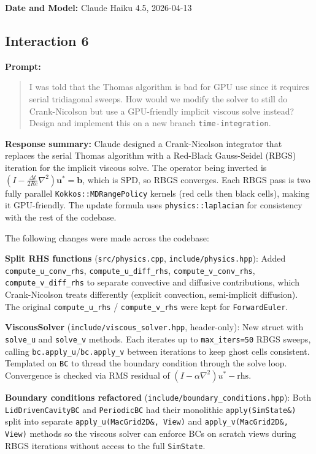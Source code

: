 \textbf{Date and Model:} Claude Haiku 4.5, 2026-04-13

\subsection*{Interaction 6}

\textbf{Prompt:}
\begin{quote}
I was told that the Thomas algorithm is bad for GPU use since it requires serial tridiagonal sweeps. How would we modify the solver to still do Crank-Nicolson but use a GPU-friendly implicit viscous solve instead? Design and implement this on a new branch \texttt{time-integration}.
\end{quote}

\textbf{Response summary:}
Claude designed a Crank-Nicolson integrator that replaces the serial Thomas algorithm with a Red-Black Gauss-Seidel (RBGS) iteration for the implicit viscous solve. The operator being inverted is $(I - \frac{\Delta t}{2 Re}\nabla^2)\mathbf{u}^* = \mathbf{b}$, which is SPD, so RBGS converges. Each RBGS pass is two fully parallel \texttt{Kokkos::MDRangePolicy} kernels (red cells then black cells), making it GPU-friendly. The update formula uses \texttt{physics::laplacian} for consistency with the rest of the codebase.

The following changes were made across the codebase:

\textbf{Split RHS functions} (\texttt{src/physics.cpp}, \texttt{include/physics.hpp}):
Added \texttt{compute\_u\_conv\_rhs}, \texttt{compute\_u\_diff\_rhs}, \texttt{compute\_v\_conv\_rhs}, \texttt{compute\_v\_diff\_rhs} to separate convective and diffusive contributions, which Crank-Nicolson treats differently (explicit convection, semi-implicit diffusion). The original \texttt{compute\_u\_rhs} / \texttt{compute\_v\_rhs} were kept for \texttt{ForwardEuler}.

\textbf{ViscousSolver} (\texttt{include/viscous\_solver.hpp}, header-only):
New struct with \texttt{solve\_u} and \texttt{solve\_v} methods. Each iterates up to \texttt{max\_iters=50} RBGS sweeps, calling \texttt{bc.apply\_u}/\texttt{bc.apply\_v} between iterations to keep ghost cells consistent. Templated on \texttt{BC} to thread the boundary condition through the solve loop. Convergence is checked via RMS residual of $(I - \alpha\nabla^2)u^* - \text{rhs}$.

\textbf{Boundary conditions refactored} (\texttt{include/boundary\_conditions.hpp}):
Both \texttt{LidDrivenCavityBC} and \texttt{PeriodicBC} had their monolithic \texttt{apply(SimState\&)} split into separate \texttt{apply\_u(MacGrid2D\&, View)} and \texttt{apply\_v(MacGrid2D\&, View)} methods so the viscous solver can enforce BCs on scratch views during RBGS iterations without access to the full \texttt{SimState}.

